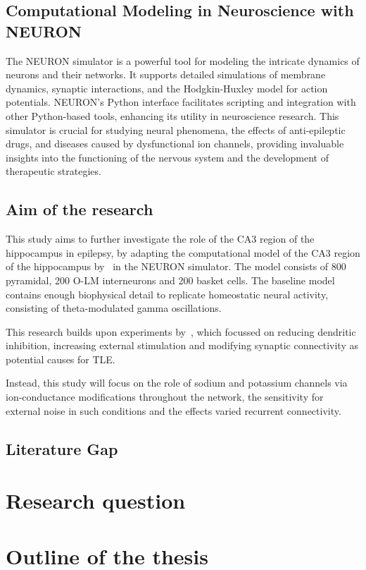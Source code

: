 \subsection{Computational Modeling in Neuroscience with NEURON}
The NEURON simulator is a powerful tool for modeling the intricate dynamics 
of neurons and their networks. It supports detailed simulations of membrane 
dynamics, synaptic interactions, and the Hodgkin-Huxley model for action 
potentials. NEURON's Python interface facilitates scripting and integration 
with other Python-based tools, enhancing its utility in neuroscience research.
This simulator is crucial for studying neural phenomena, the effects of 
anti-epileptic drugs, and diseases caused by dysfunctional ion channels, 
providing invaluable insights into the functioning of the nervous system 
and the development of therapeutic strategies.

\subsection{Aim of the research}
This study aims to further investigate the role of the CA3 region of the hippocampus in epilepsy, 
by adapting the computational model of the CA3 region of the hippocampus by~\textcite{neymotinKetamineDisruptsTheta2011} in the NEURON simulator.
The model consists of 800 pyramidal, 200 O-LM interneurons and 200 basket cells. 
The baseline model contains enough biophysical detail to replicate homeostatic neural activity, consisting of theta-modulated gamma oscillations.

This research builds upon experiments by~\textcite{sanjayImpairedDendriticInhibition2015}, 
which focussed on reducing dendritic inhibition, increasing external stimulation and modifying synaptic connectivity as potential causes for TLE\@.

Instead, this study will focus on the role of sodium and potassium channels via ion-conductance modifications throughout the network, 
the sensitivity for external noise in such conditions and the effects varied recurrent connectivity.

\subsection{Literature Gap}

\section{Research question}

\section{Outline of the thesis}